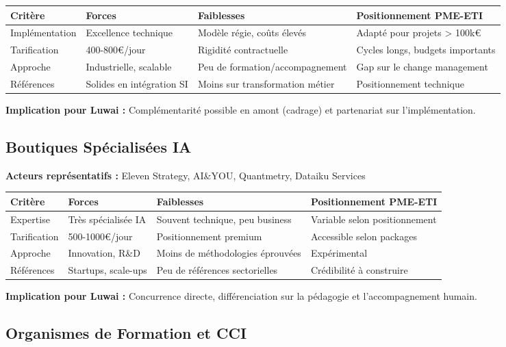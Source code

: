 \begin{longtable}{@{}p{3cm}p{4cm}p{4cm}p{4cm}@{}}
\toprule
\textbf{Critère} & \textbf{Forces} & \textbf{Faiblesses} & \textbf{Positionnement PME-ETI} \\
\midrule
Implémentation & Excellence technique & Modèle régie, coûts élevés & Adapté pour projets > 100k€ \\
Tarification & 400-800€/jour & Rigidité contractuelle & Cycles longs, budgets importants \\
Approche & Industrielle, scalable & Peu de formation/accompagnement & Gap sur le change management \\
Références & Solides en intégration SI & Moins sur transformation métier & Positionnement technique \\
\bottomrule
\end{longtable}

\textbf{Implication pour Luwai :} Complémentarité possible en amont (cadrage) et partenariat sur l'implémentation.

\subsection{Boutiques Spécialisées IA}

\textbf{Acteurs représentatifs :} Eleven Strategy, AI\&YOU, Quantmetry, Dataiku Services

\begin{longtable}{@{}p{3cm}p{4cm}p{4cm}p{4cm}@{}}
\toprule
\textbf{Critère} & \textbf{Forces} & \textbf{Faiblesses} & \textbf{Positionnement PME-ETI} \\
\midrule
Expertise & Très spécialisée IA & Souvent technique, peu business & Variable selon positionnement \\
Tarification & 500-1000€/jour & Positionnement premium & Accessible selon packages \\
Approche & Innovation, R\&D & Moins de méthodologies éprouvées & Expérimental \\
Références & Startups, scale-ups & Peu de références sectorielles & Crédibilité à construire \\
\bottomrule
\end{longtable}

\textbf{Implication pour Luwai :} Concurrence directe, différenciation sur la pédagogie et l'accompagnement humain.

\subsection{Organismes de Formation et CCI}


